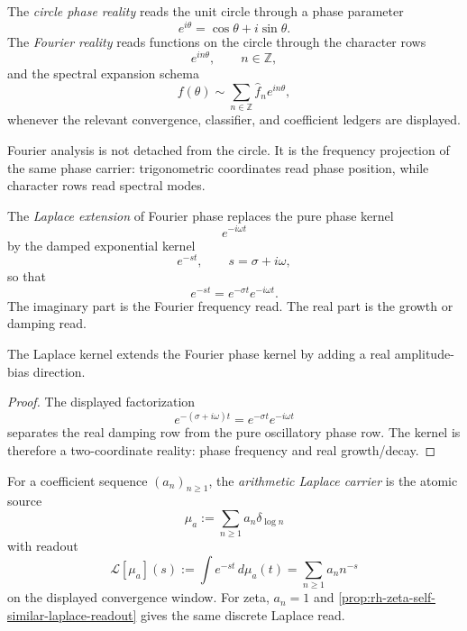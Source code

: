 \begin{definition}
\label{def:unified-reality-circle-fourier-reality}
The \emph{circle phase reality} reads the unit circle through a phase
parameter
$$
e^{i\theta}
=
\cos\theta+i\sin\theta.
$$
The \emph{Fourier reality} reads functions on the circle through the
character rows
$$
e^{in\theta},
\qquad
n\in\mathbb Z,
$$
and the spectral expansion schema
$$
f(\theta)\sim\sum_{n\in\mathbb Z}\widehat f_n e^{in\theta},
$$
whenever the relevant convergence, classifier, and coefficient ledgers
are displayed.
\end{definition}

\begin{principle}
\label{prin:unified-reality-fourier-frequency-projection}
Fourier analysis is not detached from the circle. It is the frequency
projection of the same phase carrier: trigonometric coordinates read
phase position, while character rows read spectral modes.
\end{principle}

\begin{definition}
\label{def:unified-reality-laplace-extension-fourier-phase}
The \emph{Laplace extension} of Fourier phase replaces the pure phase
kernel
$$
e^{-i\omega t}
$$
by the damped exponential kernel
$$
e^{-st},
\qquad
s=\sigma+i\omega,
$$
so that
$$
e^{-st}=e^{-\sigma t}e^{-i\omega t}.
$$
The imaginary part is the Fourier frequency read. The real part is the
growth or damping read.
\end{definition}

\begin{theorem}
\label{thm:unified-reality-laplace-fourier-bias-direction}
The Laplace kernel extends the Fourier phase kernel by adding a real
amplitude-bias direction.
\end{theorem}

\begin{proof}
The displayed factorization
$$
e^{-(\sigma+i\omega)t}=e^{-\sigma t}e^{-i\omega t}
$$
separates the real damping row from the pure oscillatory phase row. The
kernel is therefore a two-coordinate reality: phase frequency and real
growth/decay.
\end{proof}

\begin{definition}
\label{def:unified-reality-arithmetic-laplace-carrier}
For a coefficient sequence $(a_n)_{n\ge1}$, the \emph{arithmetic
Laplace carrier} is the atomic source
$$
\mu_a:=\sum_{n\ge1}a_n\delta_{\log n}
$$
with readout
$$
\mathcal L[\mu_a](s)
:=
\int e^{-st}\,d\mu_a(t)
=
\sum_{n\ge1}a_n n^{-s}
$$
on the displayed convergence window. For zeta, $a_n=1$ and
\autoref{prop:rh-zeta-self-similar-laplace-readout} gives the same
discrete Laplace read.
\end{definition}

